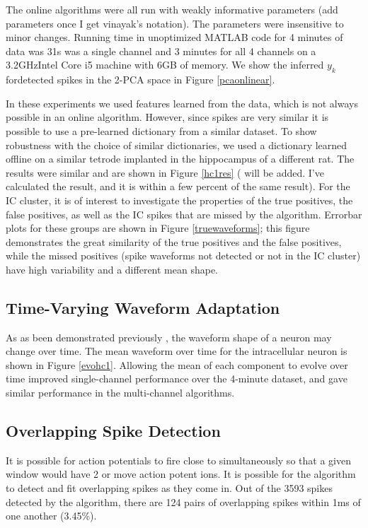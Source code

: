 The online algorithms were all run with weakly informative parameters (add parameters once I get vinayak's notation). The parameters were insensitive to minor changes.  Running time in unoptimized MATLAB code for 4 minutes of data was 31s was a single channel and 3 minutes for all 4 channels on a 3.2GHzIntel Core i5 machine with 6GB of memory.  We show the inferred $y_k$ fordetected spikes in the 2-PCA space in Figure \ref{pcaonlinear}.

In these experiments we used features learned from the data, which is not always possible in an online algorithm.  However, since spikes are very similar it is possible to use a pre-learned dictionary from a similar dataset.  To show robustness with the choice of similar dictionaries, we used a dictionary learned offline on a similar tetrode implanted in the hippocampus of a different rat.  The results were similar and are shown in Figure \ref{hc1res} ({\color{red} will be added.  I've calculated the result, and it is within a few percent of the same result}).  For the IC cluster, it is of interest to investigate the properties of the true positives, the false positives, as well as the IC spikes that are missed by the algorithm.  Errorbar plots for these groups are shown in Figure \ref{truewaveforms}; this figure demonstrates the great similarity of the true positives and the false positives, while the missed positives (spike waveforms not detected or not in the IC cluster) have high variability and a different mean shape.

\subsection{Time-Varying Waveform Adaptation}
As as been demonstrated previously \cite{calabrese2011kalman}, the waveform shape of a neuron may change over time.  The mean waveform over time for the intracellular neuron is shown in Figure \ref{evohc1}.  Allowing the mean of each component to evolve over time improved single-channel performance over the 4-minute dataset, and gave similar performance in the multi-channel algorithms.
\subsection{Overlapping Spike Detection}
It is possible for action potentials to fire close to simultaneously so that a given window would have 2 or move action potent ions.  It is possible for the algorithm to detect and fit overlapping spikes as they come in.  Out of the 3593 spikes detected by the algorithm, there are 124 pairs of overlapping spikes within 1ms of one another (3.45\%).

